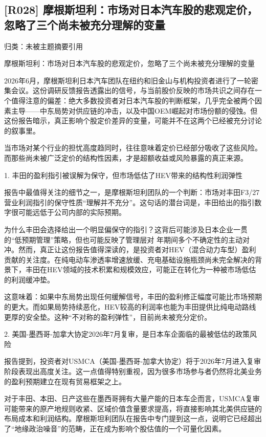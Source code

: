 \documentclass[11pt]{ctexart}
\begin{document}
\subsection{[R028] 摩根斯坦利：市场对日本汽车股的悲观定价，忽略了三个尚未被充分理解的变量}
{\small\color{refgray}归类：未被主题摘要引用}

摩根斯坦利：市场对日本汽车股的悲观定价，忽略了三个尚未被充分理解的变量

2026年6月，摩根斯坦利日本汽车团队在纽约和旧金山与机构投资者进行了一轮密集会议。这份调研反馈报告透露出的信号，与当前股价反映的市场共识之间存在一个值得注意的偏差：绝大多数投资者对日本汽车股的判断框架，几乎完全被两个因素主导——中东局势对供应链的冲击，以及中国OEM崛起对市场份额的侵蚀。但这份报告暗示，真正影响个股定价差异的变量，可能并不在这两个已经被充分讨论的叙事里。

当市场对某个行业的担忧高度趋同时，往往意味着定价已经部分吸收了这些风险。而那些尚未被广泛定价的结构性因素，才是超额收益或风险暴露的真正来源。

1. 丰田的盈利指引被误解为保守，但市场低估了HEV带来的结构性利润弹性

报告中最值得关注的细节之一，是摩根斯坦利团队的一个判断：市场对丰田F3/27营业利润指引的保守性质“理解并不充分”。这句话的潜台词是，丰田给出的指引数字很可能远低于公司内部的实际预期。

为什么丰田会选择给出一个明显偏保守的指引？这背后可能涉及日本企业一贯的“低预期管理”策略，但也可能反映了管理层对 年期间多个不确定性的主动对冲。然而，真正让这份报告值得深读的，是投资者对HEV（混合动力车型）盈利贡献的关注度。在纯电动车渗透率增速放缓、充电基础设施瓶颈尚未完全解决的背景下，丰田在HEV领域的技术积累和规模效应，可能正在转化为一种被市场低估的利润缓冲垫。

这意味着：如果中东局势出现任何缓解信号，丰田的盈利修正幅度可能比市场预期的更大。而如果局势持续恶化，HEV较高的利润率也能为丰田提供比纯电动路线更厚的安全垫。这种“不对称的盈利弹性”，目前尚未被充分定价。

2. 美国-墨西哥-加拿大协定2026年7月复审，是日本车企面临的最被低估的政策风险

报告提到，投资者对USMCA（美国-墨西哥-加拿大协定）将于2026年7月进入复审阶段表现出高度关注。这一点值得特别重视，因为很多市场参与者仍然将北美业务的盈利预期建立在现有贸易框架之上。

对于丰田、本田、日产这些在墨西哥拥有大量产能的日本车企而言，USMCA复审可能带来的原产地规则收紧、区域价值含量要求提高，将直接影响其北美供应链的布局成本和利润结构。摩根斯坦利团队在报告中专门提到这一点，说明它已经超出了“地缘政治噪音”的范畴，正在成为影响个股估值的一个可量化因素。
\end{document}
